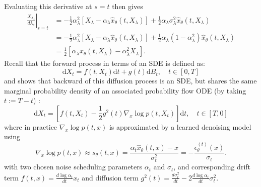 \documentclass{article}
\theoremstyle{plain}
\theoremstyle{definition}
\theoremstyle{remark}
\begin{document}
Evaluating this derivative at $s=t$ then gives
\begin{equation}
\label{DDIM derivative}
\begin{aligned}
\left.\frac{X_{\lambda_s}}{d \lambda_s}\right|_{s=t} & =-\frac{1}{2} \alpha_\lambda^2\left[X_\lambda-\alpha_\lambda \hat{x}_\theta\left(t,X_\lambda\right)\right]+\frac{1}{2} \alpha_\lambda \sigma_\lambda^2 \hat{x}_\theta\left(t,X_\lambda\right) \\
& =-\frac{1}{2} \alpha_\lambda^2\left[X_\lambda-\alpha_\lambda \hat{x}_\theta\left(t,X_\lambda\right)\right]+\frac{1}{2} \alpha_\lambda\left(1-\alpha_\lambda^2\right) \hat{x}_\theta\left(t,X_\lambda\right) \\
& =\frac{1}{2}\left[\alpha_\lambda \hat{x}_\theta\left(t,X_\lambda\right)-\alpha_\lambda^2 X_\lambda\right] .
\end{aligned}
\end{equation}
Recall that the forward process in terms of an SDE is defined as:
$$
\mathrm{d} X_t=f(t,X_t) \mathrm{d} t+g(t) \mathrm{d} B_t,\quad t\in [0,T]
$$
and \cite{Song20SGMbySDE} shows that backward of this diffusion process is an SDE, but shares the same marginal probability density of an associated probability flow ODE  (by taking $t:=T-t$) :
$$
\mathrm{d} X_t=\left[f(t,X_t)-\frac{1}{2} g^2(t) \nabla_x \log p(t,X_t)\right] \mathrm{d} t,\quad t\in [T,0]
$$
where in practice $\nabla_x \log p(t,x)$ is approximated by a learned denoising model using
\begin{equation}
\label{score_parameterization}
\nabla_x \log p(t,x) \approx s_{\theta}(t,x)=\frac{\alpha_t \hat{x}_\theta\left(t,x\right)-x}{\sigma_t^2} = -\frac{\epsilon_\theta^{(t)}\left(x\right)}{\sigma_t}.
\end{equation}
with two chosen noise scheduling parameters $\alpha_t$ and $\sigma_t$, and corresponding drift term $f(t,x)=\frac{d \log \alpha_t}{d t} x_t$ and diffusion term $g^2(t)=\frac{d \sigma_t^2}{d t}-2 \frac{d \log \alpha_t}{d t} \sigma_t^2$. 
\end{document}
